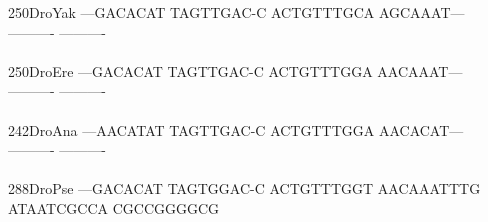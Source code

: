 \documentclass[11pt,twoside,reqno,a4paper]{article}
\begin{document}
{250\hspace*{1\charwidth}DroYak	---GACACAT	TAGTTGAC-C	ACTGTTTGCA	AGCAAAT---	----------	----------	\\
\hspace*{4\charwidth}\hspace*{7\charwidth}\hspace*{1\charwidth}\hspace*{1\charwidth}\hspace*{1\charwidth}\hspace*{1\charwidth}\hspace*{1\charwidth}\hspace*{1\charwidth}\\
250\hspace*{1\charwidth}DroEre	---GACACAT	TAGTTGAC-C	ACTGTTTGGA	AACAAAT---	----------	----------	\\
\hspace*{4\charwidth}\hspace*{7\charwidth}\hspace*{1\charwidth}\hspace*{1\charwidth}\hspace*{1\charwidth}\hspace*{1\charwidth}\hspace*{1\charwidth}\hspace*{1\charwidth}\\
242\hspace*{1\charwidth}DroAna	---AACATAT	TAGTTGAC-C	ACTGTTTGGA	AACACAT---	----------	----------	\\
\hspace*{4\charwidth}\hspace*{7\charwidth}\hspace*{1\charwidth}\hspace*{1\charwidth}\hspace*{1\charwidth}\hspace*{1\charwidth}\hspace*{1\charwidth}\hspace*{1\charwidth}\\
288\hspace*{1\charwidth}DroPse	---GACACAT	TAGTGGAC-C	ACTGTTTGGT	AACAAATTTG	ATAATCGCCA	CGCCGGGGCG	\\
\hspace*{4\charwidth}\hspace*{7\charwidth}\hspace*{1\charwidth}\hspace*{1\charwidth}\hspace*{1\charwidth}\hspace*{1\charwidth}\hspace*{1\charwidth}\hspace*{1\charwidth}\\
}
\end{document}
